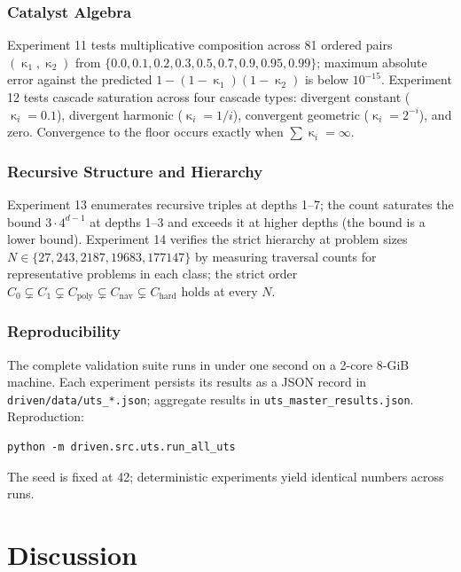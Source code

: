 \documentclass[twocolumn,a4paper]{article}
\DeclareMathOperator{\catpow}{\kappa}
\begin{document}
\section{Catalyst Algebra}

Experiment 11 tests multiplicative composition across 81 ordered pairs $(\catpow_{1},\catpow_{2})$ from $\{0.0,0.1,0.2,0.3,0.5,0.7,0.9,0.95,0.99\}$; maximum absolute error against the predicted $1-(1-\catpow_{1})(1-\catpow_{2})$ is below $10^{-15}$. Experiment 12 tests cascade saturation across four cascade types: divergent constant ($\catpow_{i}=0.1$), divergent harmonic ($\catpow_{i}=1/i$), convergent geometric ($\catpow_{i}=2^{-i}$), and zero. Convergence to the floor occurs exactly when $\sum\catpow_{i}=\infty$.

\section{Recursive Structure and Hierarchy}

Experiment 13 enumerates recursive triples at depths 1--7; the count saturates the bound $3\cdot 4^{d-1}$ at depths 1--3 and exceeds it at higher depths (the bound is a lower bound). Experiment 14 verifies the strict hierarchy at problem sizes $N\in\{27,243,2187,19683,177147\}$ by measuring traversal counts for representative problems in each class; the strict order $C_{0}\subsetneq C_{1}\subsetneq C_{\text{poly}}\subsetneq C_{\text{nav}}\subsetneq C_{\text{hard}}$ holds at every $N$.

\section{Reproducibility}

The complete validation suite runs in under one second on a 2-core 8-GiB machine. Each experiment persists its results as a JSON record in \texttt{driven/data/uts\_*.json}; aggregate results in \texttt{uts\_master\_results.json}. Reproduction:
\begin{verbatim}
python -m driven.src.uts.run_all_uts
\end{verbatim}
The seed is fixed at 42; deterministic experiments yield identical numbers across runs.

\part{Discussion}
\end{document}
